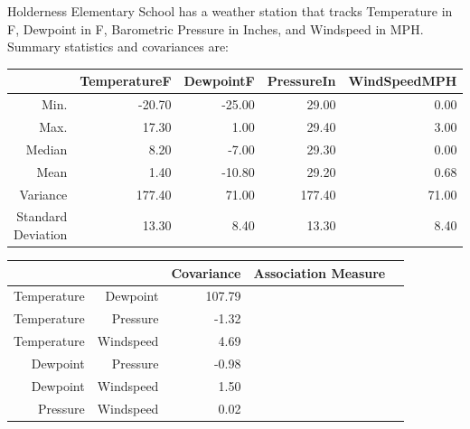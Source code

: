 \documentclass[addpoints,12pt]{exam}
\begin{document}
\begin{questions}
\question
Holderness Elementary School has a weather station that tracks Temperature in \textdegree F, Dewpoint in \textdegree F, Barometric Pressure in Inches, and Windspeed in MPH. Summary statistics and covariances are:
\vspace{5mm}
\begin{table}[ht]
\centering
\begin{tabular}{rrrrr}
  \hline
 & TemperatureF & DewpointF & PressureIn & WindSpeedMPH \\ 
  \hline
  Min. & -20.70 & -25.00 & 29.00 & 0.00 \\ 
  Max. & 17.30 & 1.00 & 29.40 & 3.00 \\ 
  Median & 8.20 & -7.00 & 29.30 & 0.00 \\ 
  Mean & 1.40 & -10.80 & 29.20 & 0.68 \\ 
  Variance & 177.40 & 71.00 & 177.40 & 71.00 \\ 
  Standard Deviation & 13.30 & 8.40 & 13.30 & 8.40 \\ 
   \hline
\end{tabular}
\end{table}
\begin{table}[ht]
\centering
\begin{tabular}{rrrrr}
  \hline
 & & Covariance & Association Measure\\ 
  \hline
Temperature & Dewpoint & 107.79 & \\
Temperature & Pressure & -1.32 & \\
Temperature & Windspeed & 4.69 & \\ 
Dewpoint & Pressure & -0.98 & \\
Dewpoint & Windspeed & 1.50 & \\ 
Pressure & Windspeed &  0.02 & \\ 
   \hline
\end{tabular}
\end{table}
\end{questions}
\end{document}
